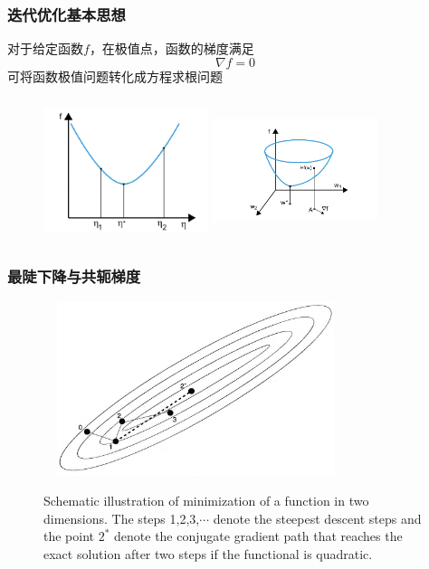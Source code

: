 \documentclass[cjk,slidestop,compress,mathserif,blue]{beamer}
\begin{document}
\frame
{
	\frametitle{迭代优化基本思想}
	对于给定函数$f$，在极值点，函数的梯度满足
	\begin{displaymath}
		\nabla f=0
	\end{displaymath}
	可将函数极值问题转化成方程求根问题
\begin{figure}[h!]
\centering
\includegraphics[height=1.65in,width=1.9in,viewport=30 0 450 360,clip]{Figures/OP_mini-1.png}
\hskip 0.1in
\includegraphics[height=1.65in,width=1.9in,viewport=150 20 560 390,clip]{Figures/OP_mini-2.png}
\label{OP_mini}
\end{figure}
}

\frame
{
	\frametitle{最陡下降与共轭梯度}
\begin{figure}[h!]
\centering
\includegraphics[height=2.0in,width=3.5in,viewport=0 0 950 590,clip]{Figures/OP_descent_CG.png}
\label{decent_CG}
\caption{\small \textrm{Schematic illustration of minimization of a function in two dimensions. The steps 1,2,3,$\cdots$ denote the steepest descent steps and the point $2^{\ast}$ denote the conjugate gradient path that reaches the exact solution after two steps if the functional is quadratic.}}%
\end{figure}
}
\end{document}
